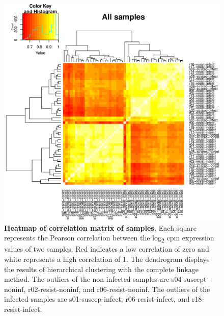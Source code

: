 \begin{figure}[!htb]
\centering
\includegraphics[width=5in]{img/ch03/heatmap-all-samples.pdf}
\caption[Heatmap of correlation matrix of samples.]{ \textbf{Heatmap
    of correlation matrix of samples.} Each square represents the
  Pearson correlation between the log\textsubscript{2} cpm expression
  values of two samples. Red indicates a low correlation of zero and
  white represents a high correlation of 1. The dendrogram displays
  the results of hierarchical clustering with the complete linkage
  method.  The outliers of the non-infected samples are
  s04-suscept-noninf, r02-resist-noninf, and r06-resist-noninf. The
  outliers of the infected samples are s01-suscep-infect,
  r06-resist-infect, and r18-resist-infect.  }
\label{fig:heat-all}
\end{figure}


